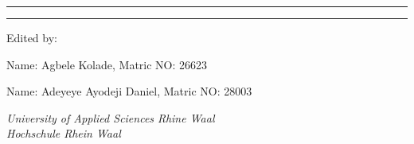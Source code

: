 \documentclass[12pt]{extreport}
\begin{document}
\vspace*{0.2in}


\begin{center}
	\rule{\textwidth}{1.6pt}\vspace*{-\baselineskip}\vspace*{2pt} %

{\Large
\textbf{}
}
\rule{\textwidth}{0.4pt} %
\newline

Edited by: 
\\
\bigskip
\vspace{0.5\baselineskip} %

\textbf{} Name: Agbele Kolade, Matric NO: 26623
\\
\vspace{0.5\baselineskip} %

\textbf{} Name: Adeyeye Ayodeji Daniel, Matric NO: 28003
\\
\vspace{0.5\baselineskip} %
\vspace{0.5\baselineskip} %

\textit{University of Applied Sciences Rhine Waal\\ Hochschule Rhein Waal } %

\vfill %

\bigskip
\end{center}

\newpage
\end{document}
